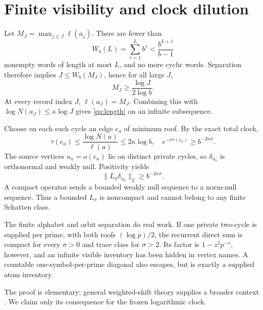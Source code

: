 \section{Finite visibility and clock dilution}

Let $M_J=\max_{j\le J}\ell(a_j)$.  There are fewer than
\[
W_b(L)=\sum_{r=1}^L b^r<\frac{b^{L+1}}{b-1}
\]
nonempty words of length at most $L$, and no more cyclic words.  Separation
therefore implies $J\le W_b(M_J)$, hence for all large $J$,
\[
M_J\ge\frac{\log J}{2\log b}.
\]
At every record index $J$, $\ell(a_J)=M_J$.  Combining this with
$\log N(a_J)\le\kappa\log J$ gives \eqref{eq:length} on an infinite
subsequence.

Choose on each such cycle an edge $e_a$ of minimum roof.  By the exact total
clock,
\[
\tau(e_a)\le \frac{\log N(a)}{\ell(a)}\le2\kappa\log b,
\quad
e^{-\sigma\tau(e_a)}\ge b^{-2\kappa\sigma}.
\]
The source vertices $u_a=o(e_a)$ lie on distinct private cycles, so
$\delta_{u_a}$ is orthonormal and weakly null.  Positivity yields
\[
\|L_\sigma\delta_{u_a}\|_2\ge b^{-2\kappa\sigma}.
\]
A compact operator sends a bounded weakly null sequence to a norm-null
sequence.  Thus a bounded $L_\sigma$ is noncompact and cannot belong to any
finite Schatten class.

The finite alphabet and orbit separation do real work.  If one private
two-cycle is supplied per prime, with both roofs $(\log p)/2$, the recurrent
direct sum is compact for every $\sigma>0$ and trace class for $\sigma>2$.
Its factor is $1-z^2p^{-s}$, however, and an infinite visible inventory has
been hidden in vertex names.  A countable one-symbol-per-prime diagonal also
escapes, but is exactly a supplied atom inventory.

The proof is elementary; general weighted-shift theory supplies a broader
context \citep{JablonskiJungStochel2012}.  We claim only its consequence for
the frozen logarithmic clock.
